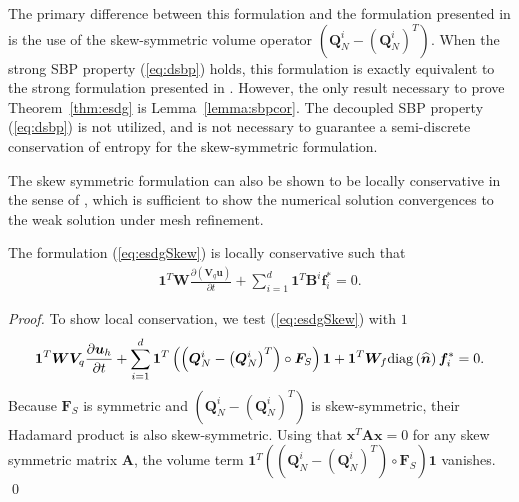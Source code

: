 \documentclass{svjour3}                     %
\renewcommand{\hat}{\widehat}
\newcommand{\diag}[1]{{\rm diag}\LRp{#1}}
\newcommand{\pd}[2]{\frac{\partial#1}{\partial#2}}
\newcommand{\LRp}[1]{\left( #1 \right)}
\begin{document}
\begin{remark}
The primary difference between this formulation and the formulation presented in \cite{chan2017discretely} is the use of the skew-symmetric volume operator $\LRp{\bm{Q}^i_N - \LRp{\bm{Q}^i_N}^T}$.  When the strong SBP property (\ref{eq:dsbp}) holds, this formulation is exactly equivalent to the strong formulation presented in \cite{chan2017discretely}.  However, the only result necessary to prove Theorem~\ref{thm:esdg} is Lemma~\ref{lemma:sbpcor}.  The decoupled SBP property (\ref{eq:dsbp}) is not utilized, and is not necessary to guarantee a semi-discrete conservation of entropy for the skew-symmetric formulation.  
\end{remark}


The skew symmetric formulation can also be shown to be locally conservative in the sense of \cite{shi2017local}, which is sufficient to show the numerical solution convergences to the weak solution under mesh refinement.  
\begin{theorem}
The formulation (\ref{eq:esdgSkew}) is locally conservative such that
\begin{align}
\bm{1}^T\bm{W}\pd{\LRp{\bm{V}_q\bm{u}}}{t} + \sum_{i=1}^d\bm{1}^T\bm{B}^i\bm{f}_i^* = 0. 
\end{align}
\end{theorem}
\begin{proof}
To show local conservation, we test (\ref{eq:esdgSkew}) with $1$
\begin{align}
\bm{1}^T\bm{W}\bm{V}_q\pd{\bm{u}_h}{t} + \sum_{i=1}^d
\bm{1}^T
\LRp{\LRp{\bm{Q}^i_N - \LRp{\bm{Q}^i_N}^T} \circ \bm{F}_S}\bm{1} + \bm{1}^T\bm{W}_f \diag{\hat{\bm{n}}}\bm{f}_i^* = 0. 
\end{align}
Because $\bm{F}_S$ is symmetric and $\LRp{\bm{Q}^i_N - \LRp{\bm{Q}^i_N}^T}$ is skew-symmetric, their Hadamard product is also skew-symmetric.  Using that $\bm{x}^T\bm{A}\bm{x} = 0$ for any skew symmetric matrix $\bm{A}$, the volume term $\bm{1}^T\LRp{\LRp{\bm{Q}^i_N - \LRp{\bm{Q}^i_N}^T} \circ \bm{F}_S}\bm{1}$ vanishes.
\qed\end{proof}
\end{document}
